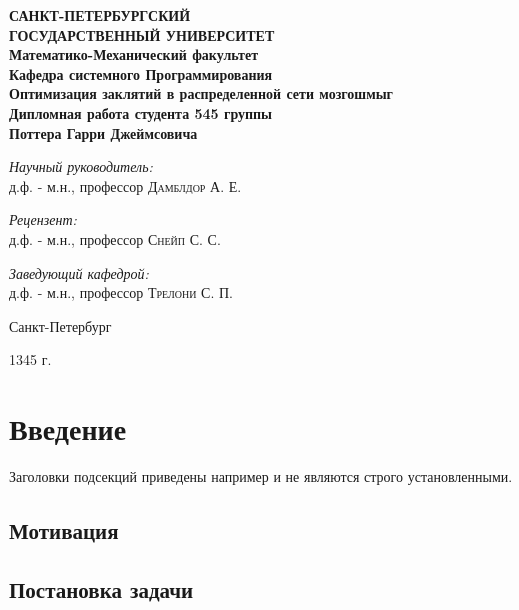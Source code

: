 \documentclass[aps,%
12pt,%
final,%
oneside,
onecolumn,%
musixtex, %
superscriptaddress,%
centertags]{article} %
\begin{document}
\begin{titlepage}
\begin{center}
\textbf{\Large САНКТ-ПЕТЕРБУРГСКИЙ \\ ГОСУДАРСТВЕННЫЙ УНИВЕРСИТЕТ} \\[1.0cm]
\textbf{\large Математико-Механический факультет} \\[0.2cm]
\textbf{\large Кафедра системного Программирования}\\[3.5cm]

\textbf{\LARGE Оптимизация заклятий в распределенной сети мозгошмыг}\\[1.0cm]
\textbf{\Large Дипломная работа студента 545 группы} \\[0.2cm]
\textbf{\Large Поттера Гарри Джеймсовича} \\[3.5cm]

\begin{flushright} \large
\emph{Научный руководитель:} \\
д.ф. - м.н., профессор \textsc{Дамблдор А. Е.}
\end{flushright}
 \begin{flushright} \large
\emph{Рецензент:} \\
д.ф. - м.н., профессор \textsc{Снейп С. С.}
\end{flushright}
\begin{flushright} \large
\emph{Заведующий кафедрой:} \\
д.ф. - м.н., профессор \textsc{Трелони С. П.}
\end{flushright}
\vfill

{\large {Санкт-Петербург}} \par
{\large {1345 г.}}
\end{center}
\end{titlepage}

\tableofcontents

\section{Введение}
Заголовки подсекций приведены например и не являются строго установленными.
\subsection{Мотивация}
\subsection{Постановка задачи}
\end{document}
